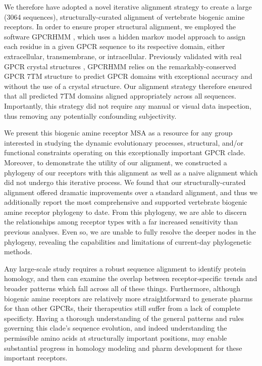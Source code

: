 \documentclass[fleqn,10pt]{wlpeerj}
\begin{document}
We therefore have adopted a novel iterative alignment strategy to create a large (3064 sequences), structurally-curated alignment of vertebrate biogenic amine receptors. In order to ensure proper structural alignment, we employed the software GPCRHMM \citep{Wistrand2006}, which uses a hidden markov model approach to assign each residue in a given GPCR sequence to its respective domain, either extracellular, transmembrane, or intracellular. Previously validated with real GPCR crystal structures \citep{SpielmanWilke2013}, GPCRHMM relies on the remarkably-conserved GPCR 7TM structure to predict GPCR domains with exceptional accuracy and without the use of a crystal structure. Our alignment strategy therefore ensured that all predicted 7TM domains aligned appropriately across all sequences. Importantly, this strategy did not require any manual or visual data inspection, thus removing any potentially confounding subjectivity. 

We present this biogenic amine receptor MSA as a resource for any group interested in studying the dynamic evolutionary processes, structural, and/or functional constraints operating on this exceptionally important GPCR clade. Moreover, to demonstrate the utility of our alignment, we constructed a phylogeny of our receptors with this alignment as well as a naive alignment which did not undergo this iterative process. We found that our structurally-curated alignment offered dramatic improvements over a standard alignment, and thus we additionally report the most comprehensive and supported vertebrate biogenic amine receptor phylogeny to date. From this phylogeny, we are able to discern the relationships among receptor types with a far increased sensitivity than previous analyses. Even so, we are unable to fully resolve the deeper nodes in the phylogeny, revealing the capabilities and limitations of current-day phylogenetic methods.


Any large-scale study requires a robust sequence alignment to identify protein homology, and then can examine the overlap between receptor-specific trends and broader patterns which fall across all of these things. Furthermore, although biogenic amine receptors are relatively more straightforward to generate pharms for than other GPCRs, their therapeutics still suffer from a lack of complete specificty. Having a thorough understanding of the general patterns and rules governing this clade's sequence evolution, and indeed understanding the permissible amino acids at structurally important positions, may enable substantial progress in homology modeling and pharm development for these important receptors.
\end{document}
